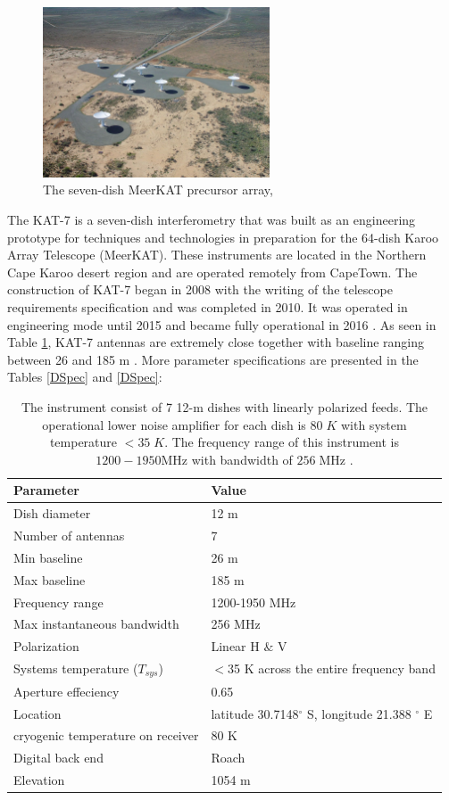 \begin{figure}[H]
  \centering
    \includegraphics[width=0.6\textwidth]{images/K7.png}
    \caption{The seven-dish MeerKAT precursor array, \citep{carignan2013kat}}
  \label{images/kat7.png}
\end{figure}

The KAT-7 is a seven-dish interferometry that was built as an engineering prototype for  techniques and technologies in preparation for the 64-dish Karoo Array Telescope (MeerKAT). These instruments are located in the Northern Cape Karoo desert region and are operated remotely from CapeTown. The construction of  KAT-7 began in
2008 with the writing of the telescope requirements specification and was completed in 2010.  It was operated in engineering mode until 2015  and became fully operational in 2016  \citep{foley2016engineering}. As seen in Table \ref{images/kat7.png}, KAT-7 antennas are extremely close together with baseline ranging between 26 and 185 m \citep{carignan2013kat}. More parameter specifications are presented in the Tables \ref{DSpec} and \ref{DSpec}:
\begin{table}[H]\centering
\begin{tabular}{l l }
\toprule
\textbf{Parameter} & \textbf{Value}\\
\midrule
Dish diameter&12 m \\
Number of antennas& 7\\
Min baseline & 26 m\\
Max baseline & 185 m\\
Frequency range & 1200-1950 MHz\\
Max instantaneous bandwidth &256 MHz\\
Polarization   & Linear H $\&$ V\\
Systems temperature ($T_{sys}$) & $<$35 K across the entire frequency band\\
Aperture effeciency & 0.65\\
Location &  latitude 30.7148$^{\circ}$ S, longitude 21.388 $^{\circ}$ E\\
cryogenic temperature on receiver & 80 K\\
Digital back end & Roach \\
Elevation & 1054 m\\
\bottomrule
\end{tabular}
\caption{The instrument consist of 7 12-m dishes with linearly polarized feeds. The operational lower noise amplifier for each dish is $80\;K$  with system temperature $<35\;K$. The frequency range of this instrument is $1200-1950 \text{MHz}$ with bandwidth of $256\;\text{MHz}$ \citep{foley2016engineering}.}
\label{K7 spec}
\end{table}


